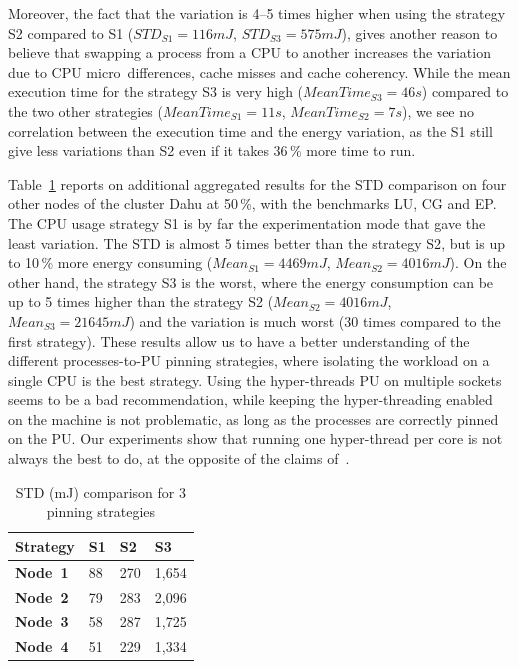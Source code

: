 Moreover, the fact that the variation is 4--5 times higher when using the strategy \textsf{S2} compared to \textsf{S1} ($STD_{S1}=116 mJ$, $STD_{S3}=575 mJ$), gives another reason to believe that swapping a process from a CPU to another increases the variation due to CPU micro~differences, cache misses and cache coherency.
While the mean execution time for the strategy \textsf{S3} is very high ($MeanTime_{S3}= 46 s$) compared to the two other strategies ($MeanTime_{S1}= 11 s$, $MeanTime_{S2}= 7 s$), we see no correlation between the execution time and the energy variation, as the \textsf{S1} still give less variations than \textsf{S2} even if it takes 36\,\% more time to run.

Table~\ref{table:corespinning} reports on additional aggregated results for the STD comparison on four other nodes of the cluster \textsf{Dahu} at 50\,\%, with the benchmarks \textsf{LU}, \textsf{CG} and \textsf{EP}.
The CPU usage strategy \textsf{S1} is by far the experimentation mode that gave the least variation.
The STD is almost 5 times better than the strategy \textsf{S2}, but is up to 10\,\% more energy consuming ($Mean_{S1}=4469 mJ$, $Mean_{S2}=4016 mJ$).
On the other hand, the strategy \textsf{S3} is the worst, where the energy consumption can be up to 5 times higher than the strategy \textsf{S2} ($Mean_{S2}=4016 mJ$, $Mean_{S3}=21645 mJ$) and the variation is much worst (30 times compared to the first strategy).
These results allow us to have a better understanding of the different processes-to-PU pinning strategies, where isolating the workload on a single CPU is the best strategy.
Using the hyper-threads PU on multiple sockets seems to be a bad recommendation, while keeping the hyper-threading enabled on the machine is not problematic, as long as the processes are correctly pinned on the PU.
Our experiments show that running one hyper-thread per core is not always the best to do, at the opposite of the claims of~\cite{marathe_empirical_2017_m}.

\begin{table}
    \centering
    \caption{STD (mJ) comparison for 3 pinning strategies}
    \label{table:corespinning}
    \small
    \begin{tabular}{|l|l|l|l|}
        \hline
        \textbf{Strategy} & \textbf{S1} & \textbf{S2} & \textbf{S3} \\
        \hline
        \hline
        \textbf{Node~1}   & 88          & 270         & 1,654       \\
        \hline
        \textbf{Node~2}   & 79          & 283         & 2,096       \\
        \hline
        \textbf{Node~3}   & 58          & 287         & 1,725       \\
        \hline
        \textbf{Node~4}   & 51          & 229         & 1,334       \\
        \hline
    \end{tabular}
\end{table}

